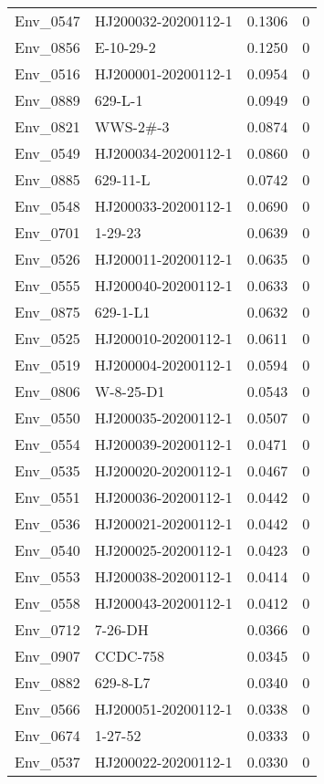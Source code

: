 \begin{longtable}{llrr}
  Env\_0547 & HJ200032-20200112-1 & 0.1306 &     0 \\ 
  Env\_0856 & E-10-29-2 & 0.1250 &     0 \\ 
  Env\_0516 & HJ200001-20200112-1 & 0.0954 &     0 \\ 
  Env\_0889 & 629-L-1 & 0.0949 &     0 \\ 
  Env\_0821 & WWS-2\#-3 & 0.0874 &     0 \\ 
  Env\_0549 & HJ200034-20200112-1 & 0.0860 &     0 \\ 
  Env\_0885 & 629-11-L & 0.0742 &     0 \\ 
  Env\_0548 & HJ200033-20200112-1 & 0.0690 &     0 \\ 
  Env\_0701 & 1-29-23 & 0.0639 &     0 \\ 
  Env\_0526 & HJ200011-20200112-1 & 0.0635 &     0 \\ 
  Env\_0555 & HJ200040-20200112-1 & 0.0633 &     0 \\ 
  Env\_0875 & 629-1-L1 & 0.0632 &     0 \\ 
  Env\_0525 & HJ200010-20200112-1 & 0.0611 &     0 \\ 
  Env\_0519 & HJ200004-20200112-1 & 0.0594 &     0 \\ 
  Env\_0806 & W-8-25-D1 & 0.0543 &     0 \\ 
  Env\_0550 & HJ200035-20200112-1 & 0.0507 &     0 \\ 
  Env\_0554 & HJ200039-20200112-1 & 0.0471 &     0 \\ 
  Env\_0535 & HJ200020-20200112-1 & 0.0467 &     0 \\ 
  Env\_0551 & HJ200036-20200112-1 & 0.0442 &     0 \\ 
  Env\_0536 & HJ200021-20200112-1 & 0.0442 &     0 \\ 
  Env\_0540 & HJ200025-20200112-1 & 0.0423 &     0 \\ 
  Env\_0553 & HJ200038-20200112-1 & 0.0414 &     0 \\ 
  Env\_0558 & HJ200043-20200112-1 & 0.0412 &     0 \\ 
  Env\_0712 & 7-26-DH & 0.0366 &     0 \\ 
  Env\_0907 & CCDC-758 & 0.0345 &     0 \\ 
  Env\_0882 & 629-8-L7 & 0.0340 &     0 \\ 
  Env\_0566 & HJ200051-20200112-1 & 0.0338 &     0 \\ 
  Env\_0674 & 1-27-52 & 0.0333 &     0 \\ 
  Env\_0537 & HJ200022-20200112-1 & 0.0330 &     0 \\ 

\end{longtable}
